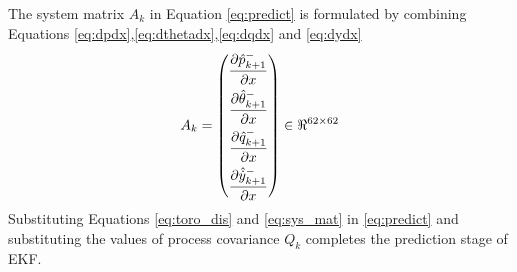 \begin{enumerate}
\begin{itemize}
\end{itemize}
The system matrix $A_k$ in Equation \ref{eq:predict} is formulated by combining Equations \ref{eq:dpdx},\ref{eq:dthetadx},\ref{eq:dqdx} and \ref{eq:dydx}
\begin{equation}
\label{eq:sys_mat}
A_k = \left(
\begin{aligned}
\frac{\partial {\hat{p}_{k+1}^-}}{\partial {x}} \\
\frac{\partial {\hat{\theta}_{k+1}^-}}{\partial {x}} \\
\frac{\partial {\hat{q}_{k+1}^-}}{\partial {x}}\\
\frac{\partial {\hat{\dot{y}}_{k+1}^-}}{\partial {x}}
\end{aligned} \right)
\in \Re^{62 \times 62}
\end{equation}
Substituting Equations \ref{eq:toro_dis} and \ref{eq:sys_mat} in \ref{eq:predict} and substituting the values of process covariance $Q_k$ completes the prediction stage of EKF.


\end{enumerate}
